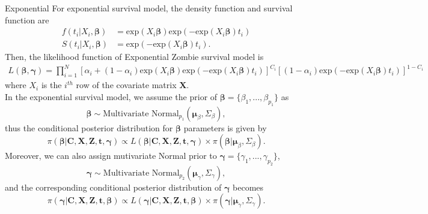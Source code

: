 \documentclass[a4paper, 12pt]{article}
\makeatletter
\newcommand {\dprod}{\displaystyle \prod}
\renewcommand{\subsection}{\@startsection
	{subsection}    {2}    {0mm}    {-0.5\baselineskip}    {0.01\baselineskip}    {\normalfont\normalsize\itshape\center}}
\makeatother
\begin{document}
\subsection{Exponential}
\noindent 
For exponential survival model, the density function and survival function are
\begin{equation}
\begin{aligned}
f(t_i|X_i, \mathbf{\beta}) &= \mbox{exp}(X_i\mathbf{\beta})\mbox{exp}(- \mbox{exp}(X_i\mathbf{\beta})t_i)\\
S(t_i|X_i, \mathbf{\beta}) &= \mbox{exp}(- \mbox{exp}(X_i\mathbf{\beta})t_i).
\end{aligned}
\end{equation}
Then, the likelihood function of Exponential Zombie survival model is
\begin{equation}
\begin{aligned}
L(\mathbf{\beta}, \mathbf{\gamma})=\dprod\limits_{i=1}^{N}[\alpha _{i}+(1-\alpha _{i})\mbox{exp}(X_i\mathbf{\beta})\mbox{exp}(- \mbox{exp}(X_i\mathbf{\beta})t_i)]^{C_{i}}[(1-\alpha _{i})\mbox{exp}(- \mbox{exp}(X_i\mathbf{\beta})t_i)]^{1-C_{i}}
\end{aligned}
\end{equation}
where $X_i$ is the $i^{th}$ row of the covariate matrix $\mathbf{X}$.\\ \newline
In the exponential survival model, we assume the prior of $\mathbf{\beta}=\{\beta_1,...,\beta_{p_1}\}$ as
\begin{equation}
\mathbf{\beta} \sim \mbox{Multivariate Normal}_{p_1}(\mathbf{\mu}_{\beta}, \Sigma_{\beta}),
\end{equation}
thus the conditional posterior distribution for $\mathbf{\beta}$ parameters is given by
\begin{equation}
\pi(\mathbf{\beta}|\mathbf{C}, \mathbf{X}, \mathbf{Z}, \mathbf{t}, \mathbf{\gamma}) \propto L(\mathbf{\beta}|\mathbf{C}, \mathbf{X}, \mathbf{Z}, \mathbf{t}, \mathbf{\gamma})\times \pi(\mathbf{\beta}|\mathbf{\mu}_{\beta}, \Sigma_{\beta}).
\end{equation}
Moreover, we can also assign mutivariate Normal prior to $\mathbf{\gamma}=\{\gamma_1,...,\gamma_{p_2}\}$,
\begin{equation}
\mathbf{\gamma} \sim \mbox{Multivariate Normal}_{p_2}(\mathbf{\mu}_{\gamma}, \Sigma_{\gamma}),
\end{equation}
and the corresponding conditional posterior distribution of $\mathbf{\gamma}$ becomes 
\begin{equation}
\pi(\mathbf{\gamma}|\mathbf{C}, \mathbf{X}, \mathbf{Z}, \mathbf{t}, \mathbf{\beta}) \propto L(\mathbf{\gamma}|\mathbf{C}, \mathbf{X}, \mathbf{Z}, \mathbf{t}, \mathbf{\beta})\times \pi(\mathbf{\gamma}|\mathbf{\mu}_{\gamma}, \Sigma_{\gamma}).
\end{equation}
\end{document}

